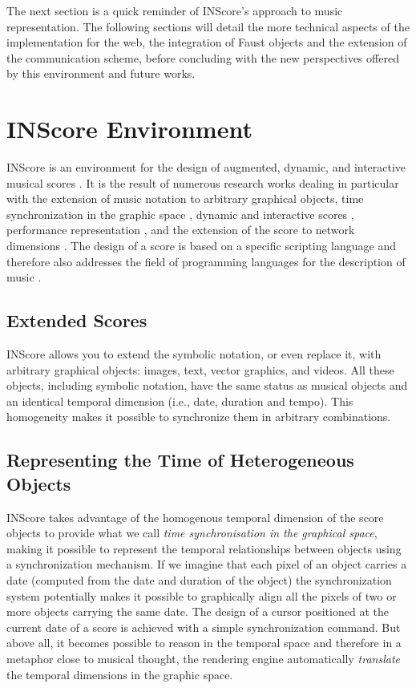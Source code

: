 \documentclass{article}
\begin{document}
The next section is a quick reminder of INScore's approach to music representation. The following sections will detail the more technical aspects of the implementation for the web, the integration of Faust objects and the extension of the communication scheme, before concluding with the new perspectives offered by this environment and future works.


\section{INScore Environment}\label{sec:inscore}

INScore is an environment for the design of augmented, dynamic, and interactive musical scores \cite{Fober:12a}. It is the result of numerous research works dealing in particular with the extension of music notation to arbitrary graphical objects, time synchronization in the graphic space \cite{fober:hal-02158957}, dynamic and interactive scores \cite{fober:hal-00851956}, performance representation \cite{fober:hal-02158968}, and the extension of the score to network dimensions \cite{Fober:15b}.
The design of a score is based on a specific scripting language and therefore also addresses the field of programming languages for the description of music \cite{fober:hal-02368958}. 

\subsection{Extended Scores}
INScore allows you to extend the symbolic notation, or even replace it, with arbitrary graphical objects: images, text, vector graphics, and videos. All these objects, including symbolic notation, have the same status as musical objects and an identical temporal dimension (i.e., date, duration and tempo). This homogeneity makes it possible to synchronize them in arbitrary combinations.

\subsection{Representing the Time of Heterogeneous Objects}
INScore takes advantage of the homogenous temporal dimension of the score objects to provide what we call \emph{time synchronisation in the graphical space}, making it possible to represent the temporal relationships between objects using a synchronization mechanism. If we imagine that each pixel of an object carries a date (computed from the date and duration of the object) the synchronization system potentially makes it possible to graphically align all the pixels of two or more objects carrying the same date. The design of a cursor positioned at the current date of a score is achieved with a simple synchronization command. But above all, it becomes possible to reason in the temporal space and therefore in a metaphor close to musical thought, the rendering engine automatically \emph{translate} the temporal dimensions in the graphic space.
\end{document}

